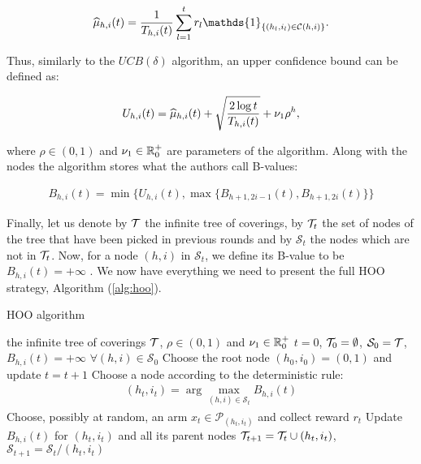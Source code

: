 \begin{align}
\wh{\mu}_{h,i}(t) = \frac{1}{T_{h,i}(t)}\sum_{l=1}^{t}r_l\mathds{1}_{\{(h_l, i_l)\in\mathcal{C}(h,i)\}}.
\end{align}

Thus, similarly to the $UCB(\delta)$ algorithm, an upper confidence bound can be defined as:

\begin{align}
U_{h,i}(t) = \widehat{\mu}_{h,i}(t) + \sqrt{\frac{2\log{t}}{T_{h,i}(t)}} + \nu_1\rho^h,
\end{align}

where $\rho\in(0,1)$ and $\nu_1\in\mathbb{R}^+_0$ are parameters of the algorithm. Along with the nodes the algorithm stores what the authors call B-values:

\begin{align}
B_{h,i}(t) = \min\{U_{h,i}(t), \max\{B_{h+1,2i-1}(t), B_{h+1,2i}(t)\}\}
\end{align}

Finally, let us denote by $\mathcal{T}$ the infinite tree of coverings, by $\mathcal{T}_t$ the set of nodes of the tree that have been picked in previous rounds and by $\mathcal{S}_t$ the nodes which are not in $\mathcal{T}_t$. Now, for a node $(h,i)$ in $\mathcal{S}_t$, we define
its B-value to be $B_{h,i}(t)=+\infty$ . We now have everything we need to present the full \gls{HOO} strategy, \ie Algorithm (\ref{alg:hoo}).

\begin{algorithm}[t]
	\caption{\gls{HOO} algorithm}
	\label{alg:hoo}
	\begin{algorithmic}[1]
	 the infinite tree of coverings $\mathcal{T}$, $\rho\in(0,1)$ and $\nu_1\in\mathbb{R}^+_0$
	 $t=0$, $\mathcal{T}_0=\emptyset$, $\mathcal{S}_0=\mathcal{T}$, $B_{h,i}(t)=+\infty$ $\forall (h,i)\in\mathcal{S}_0$
	\State Choose the root node $(h_0, i_0)=(0,1)$ and update $t = t+1$
		\State Choose a node according to the deterministic rule:
		\begin{align}
		(h_t, i_t) = \arg\max_{(h, i)\in\mathcal{S}_t}B_{h,i}(t)
		\end{align}
		\State Choose, possibly at random, an arm $x_t\in\mathcal{P}_{(h_t, i_t)}$ and collect reward $r_t$
		\State Update $B_{h,i}(t)$ for $(h_t,i_t)$ and all its parent nodes
		\State $\mathcal{T}_{t+1}=\mathcal{T}_t\cup(h_t,i_t)$, $\mathcal{S}_{t+1}=\mathcal{S}_t/(h_t,i_t)$
	\EndFor
	\end{algorithmic}
\end{algorithm}


